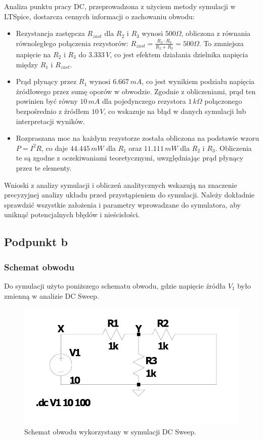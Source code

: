 \documentclass[10pt]{article}
\begin{document}
	Analiza punktu pracy DC, przeprowadzona z użyciem metody symulacji w LTSpice, dostarcza cennych informacji o zachowaniu obwodu:
	
	\begin{itemize}
		\item Rezystancja zastępcza \(R_{zast}\) dla \(R_2\) i \(R_3\) wynosi \(500\Omega\), obliczona z równania równoległego połączenia rezystorów: \(R_{zast} = \frac{R_2 \cdot R_3}{R_2 + R_3} = 500\Omega\). To zmniejsza napięcie na \(R_2\) i \(R_3\) do \(3.333\,V\), co jest efektem działania dzielnika napięcia między \(R_1\) i \(R_{zast}\).
		
		\item Prąd płynący przez \(R_1\) wynosi \(6.667\,mA\), co jest wynikiem podziału napięcia źródłowego przez sumę oporów w obwodzie. Zgodnie z obliczeniami, prąd ten powinien być równy \(10\,mA\) dla pojedynczego rezystora \(1\,k\Omega\) połączonego bezpośrednio z źródłem \(10\,V\), co wskazuje na błąd w danych symulacji lub interpretacji wyników. 
		
		\item Rozpraszana moc na każdym rezystorze została obliczona na podstawie wzoru \(P = I^2R\), co daje \(44.445\,mW\) dla \(R_1\) oraz \(11.111\,mW\) dla \(R_2\) i \(R_3\). Obliczenia te są zgodne z oczekiwaniami teoretycznymi, uwzględniając prąd płynący przez te elementy.
	\end{itemize}
	
	Wnioski z analizy symulacji i obliczeń analitycznych wskazują na znaczenie precyzyjnej analizy układu przed przystąpieniem do symulacji. Należy dokładnie sprawdzić wszystkie założenia i parametry wprowadzane do symulatora, aby uniknąć potencjalnych błędów i nieścisłości.
	\pagebreak
	\subsection*{Podpunkt b}
	\subsubsection*{Schemat obwodu}
	Do symulacji użyto poniższego schematu obwodu, gdzie napięcie źródła \( V_1 \) było zmienną w analizie DC Sweep.
	
	\begin{figure}[H]
		\hspace*{1cm}
		\includegraphics[width=0.8\linewidth]{1bobwod}
		\caption{Schemat obwodu wykorzystany w symulacji DC Sweep.}
		\label{fig:1bobwod}
	\end{figure}
	
\end{document}
